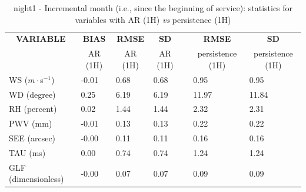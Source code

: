 \begin{table}[]
\begin{center}
\begin{tabular}{|l|l|l|l|l|l|l|}
\hline
\multicolumn{1}{|c|}{\cellcolor[HTML]{C0C0C0}\textbf{VARIABLE}} & \multicolumn{1}{c|}{\cellcolor[HTML]{C0C0C0}\textbf{BIAS}} & \multicolumn{1}{c|}{\cellcolor[HTML]{C0C0C0}\textbf{RMSE}} & \multicolumn{1}{c|}{\cellcolor[HTML]{C0C0C0}\textbf{SD}} & & \multicolumn{1}{c|}{\cellcolor[HTML]{C0C0C0}\textbf{RMSE}} & \multicolumn{1}{c|}{\cellcolor[HTML]{C0C0C0}\textbf{SD}}\\
\multicolumn{1}{|c|}{\cellcolor[HTML]{C0C0C0}} & \multicolumn{1}{c|}{\cellcolor[HTML]{C0C0C0}AR (1H)} & \multicolumn{1}{c|}{\cellcolor[HTML]{C0C0C0}AR (1H)} & \multicolumn{1}{c|}{\cellcolor[HTML]{C0C0C0}AR (1H)} & & \multicolumn{1}{c|}{\cellcolor[HTML]{C0C0C0} persistence (1H)} & \multicolumn{1}{c|}{\cellcolor[HTML]{C0C0C0}persistence (1H)}\\\hline
\cellcolor[HTML]{C0C0C0}WS ($m\cdot$s$^{-1}$) &     -0.01  &      0.68  &      0.68  & &      0.95  &      0.95\\
\cellcolor[HTML]{C0C0C0}WD (degree)           &      0.25  &      6.19  &      6.19  & &     11.97  &     11.84\\
\cellcolor[HTML]{C0C0C0}RH (percent)          &      0.02  &      1.44  &      1.44  & &      2.32  &      2.31\\
\cellcolor[HTML]{C0C0C0}PWV (mm)              &     -0.01 &      0.13 &      0.13 & &      0.22 &      0.22\\
\cellcolor[HTML]{C0C0C0}SEE (arcsec)          &     -0.00 &      0.11 &      0.11 & &      0.16 &      0.16\\
\cellcolor[HTML]{C0C0C0}TAU (ms)              &      0.00 &      0.74 &      0.74 & &      1.24 &      1.24\\
\cellcolor[HTML]{C0C0C0}GLF (dimensionless)   &     -0.00 &      0.07 &      0.07 & &      0.09 &      0.09\\
\hline
\end{tabular}
\caption{night1 - Incremental month (i.e., since the beginning of service): statistics for variables with AR (1H) \textit{vs} persistence (1H)}\label{tab:night1:statAFT:IM}
\end{center}
\end{table}

